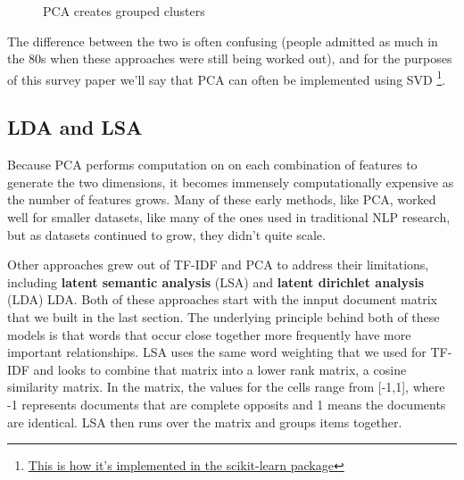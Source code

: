 \documentclass[11pt, table]{diazessay} %
\begin{document}
\begin{sloppypar}
\begin{figure}[H]
        \caption{PCA creates grouped clusters}
      \end{figure}



The difference between the two is often confusing (people admitted as much in the 80s \cite{gerbrands1981relationships} when these approaches were still being worked out), and for the purposes of this survey paper we'll say that PCA can often be implemented using SVD \footnote{\href{https://scikit-learn.org/stable/modules/generated/sklearn.decomposition.PCA.html}{This is how it's implemented in the scikit-learn package}}.  


\subsection{LDA and LSA}

Because PCA performs computation on on each combination of features to generate the two dimensions, it becomes immensely computationally expensive as the number of features grows.  Many of these early methods, like PCA, worked well for smaller datasets, like many of the ones used in traditional NLP research,  but as datasets continued to grow, they didn’t quite scale.  

Other approaches grew out of TF-IDF and PCA to address their limitations, including \textbf{latent semantic analysis} (LSA) and \textbf{latent dirichlet analysis} (LDA) LDA\cite{cvitanic2016lda}.  Both of these approaches start with the innput document matrix that we built in the last section. The underlying principle behind both of these models is that words that occur close together more frequently have more important relationships. LSA uses the same word weighting that we used for TF-IDF and looks to combine that matrix into a lower rank matrix, a cosine similarity matrix. In the matrix, the values for the cells range from [-1,1], where -1 represents documents that are complete opposits and 1 means the documents are identical. LSA then runs over the matrix and groups items together.  


\end{sloppypar}
\end{document}
